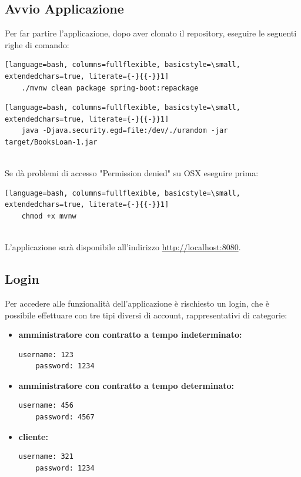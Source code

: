 \documentclass[a4paper,10pt]{article}
\begin{document}
\subsection*{Avvio Applicazione}

Per far partire l'applicazione, dopo aver clonato il repository, eseguire le seguenti righe di comando:\\

\begin{lstlisting}[language=bash, columns=fullflexible, basicstyle=\small, extendedchars=true, literate={-}{{-}}1]
	./mvnw clean package spring-boot:repackage
\end{lstlisting}

\begin{lstlisting}[language=bash, columns=fullflexible, basicstyle=\small, extendedchars=true, literate={-}{{-}}1]
	java -Djava.security.egd=file:/dev/./urandom -jar target/BooksLoan-1.jar
\end{lstlisting}

\noindent \\Se dà problemi di accesso "Permission denied" su OSX eseguire prima:
\begin{lstlisting}[language=bash, columns=fullflexible, basicstyle=\small, extendedchars=true, literate={-}{{-}}1]
	chmod +x mvnw
\end{lstlisting}

\noindent \\L'applicazione sarà disponibile all'indirizzo \href{http://localhost:8080}{http://localhost:8080}.\\

\subsection*{Login}
\noindent Per accedere alle funzionalità dell'applicazione è rischiesto un login, che è possibile effettuare con tre tipi diversi di account, rappresentativi di categorie:

\begin{itemize}
	\item \textbf{amministratore con contratto a tempo indeterminato:}
\begin{lstlisting}[language=bash]
    username: 123 
    password: 1234
\end{lstlisting}
	\item \textbf{amministratore con contratto a tempo determinato:}
\begin{lstlisting}[language=bash]
    username: 456 
    password: 4567
\end{lstlisting}
	\item \textbf{cliente:}
\begin{lstlisting}[language=bash]
    username: 321 
    password: 1234
\end{lstlisting}
\end{itemize}
\end{document}
